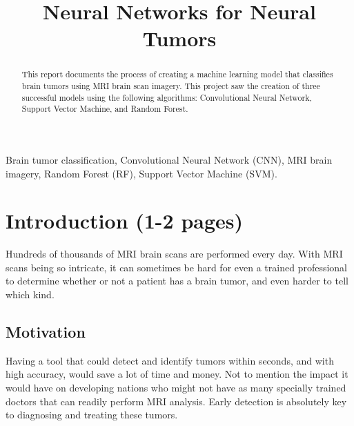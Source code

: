\documentclass[conference]{IEEEtran}
\begin{document}
\title{Neural Networks for Neural Tumors}

\author{

\and
{}

\and
{}

\and
{}

\and
{}
}

\maketitle

\begin{abstract}
This report documents the process of creating a machine learning model that classifies brain tumors using MRI brain scan imagery. This project saw the creation of three successful models using the following algorithms: Convolutional Neural Network, Support Vector Machine, and Random Forest. 
\end{abstract}

\begin{IEEEkeywords}
Brain tumor classification, Convolutional Neural Network (CNN), MRI brain imagery, Random Forest (RF), Support Vector Machine (SVM). 
\end{IEEEkeywords}

\large 
\section{\large Introduction (1-2 pages)}
Hundreds of thousands of MRI brain scans are performed every day. With MRI scans being so intricate, it can sometimes be hard for even a trained professional to determine whether or not a patient has a brain tumor, and even harder to tell which kind. 

\subsection{\large Motivation}
Having a tool that could detect and identify tumors within seconds, and with high accuracy, would save a lot of time and money. Not to mention the impact it would have on developing nations who might not have as many specially trained doctors that can readily perform MRI analysis. Early detection is absolutely key to diagnosing and treating these tumors.
\end{document}
